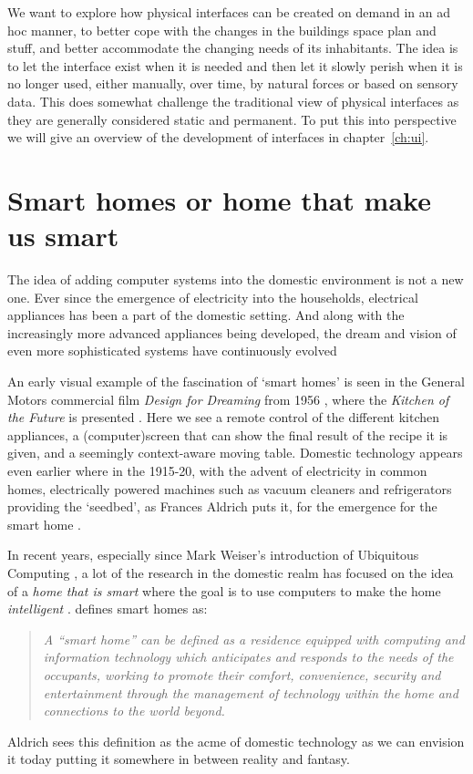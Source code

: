 We want to explore how physical interfaces can be created on demand in an ad hoc manner, to better cope with the changes in the buildings space plan and stuff, and better accommodate the changing needs of its inhabitants.
The idea is to let the interface exist when it is needed and then let it slowly perish when it is no longer used, either manually, over time, by natural forces or based on sensory data.
This does somewhat challenge the traditional view of physical interfaces as they are generally considered static and permanent.
To put this into perspective we will give an overview of the development of interfaces in chapter~\ref{ch:ui}. 

\section{Smart homes or home that make us smart}
The idea of adding computer systems into the domestic environment is not a new one.
Ever since the emergence of electricity into the households, electrical appliances has been a part of the domestic setting.
And along with the increasingly more advanced appliances being developed, the dream and vision of even more sophisticated systems have continuously evolved

An early visual example of the fascination of `smart homes' is seen in the General Motors commercial film \emph{Design for Dreaming} from 1956 \citep{designfordreaming,designfordreamingWIKIPEDIA}, where the \emph{Kitchen of the Future} is presented \citep{homeofthefutureWIKIPEDIA}.
Here we see a remote control of the different kitchen appliances, a (computer)screen that can show the final result of the recipe it is given, and a seemingly context-aware moving table.
Domestic technology appears even earlier where in the 1915-20, with the advent of electricity in common homes, electrically powered machines such as vacuum cleaners and refrigerators providing the `seedbed', as Frances Aldrich puts it, for the emergence for the smart home \citep{aldrich2003smart}.

In recent years, especially since Mark Weiser's introduction of Ubiquitous Computing \citep{weiser1991computer}, a lot of the research in the domestic realm has focused on the idea of a \emph{home that is smart} where the goal is to use computers to make the home \emph{intelligent} \citep{taylor2007homes}.
\citet{aldrich2003smart} defines smart homes as:

\begin{quotation}
\emph{A ``smart home'' can be defined as a residence equipped with computing and information technology which anticipates and responds to the needs of the occupants, working to promote their comfort, convenience, security and entertainment through the management of technology within the home and connections to the world beyond.}
\end{quotation}
Aldrich sees this definition as the acme of domestic technology as we can envision it today putting it somewhere in between reality and fantasy.

